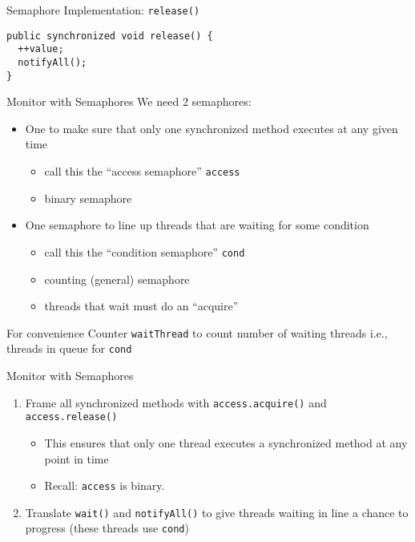 \begin{frame}[fragile]{Semaphore Implementation: \lstinline!release()!}
\begin{lstlisting}
public synchronized void release() {
  ++value;
  notifyAll();
}
\end{lstlisting}
\end{frame}

\begin{frame}{Monitor with Semaphores}
  We need 2 semaphores:
  \begin{itemize}
  \item	One to make sure that only one synchronized method executes at any given time
    \begin{itemize}
    \item call this the ``access semaphore'' \lstinline!access!
    \item binary semaphore
    \end{itemize}
  \item One semaphore to line up threads that are waiting for some condition
    \begin{itemize}
    \item call this the ``condition semaphore'' \lstinline!cond!
    \item counting (general) semaphore
    \item threads that wait must do an ``acquire''
    \end{itemize}
  \end{itemize}


  \begin{block}{For convenience}
    Counter \lstinline!waitThread! to count number of waiting threads
    i.e., threads in queue for \lstinline!cond!
  \end{block}  
\end{frame}

\begin{frame}{Monitor with Semaphores}
  \begin{enumerate}
  \item Frame all synchronized methods with \lstinline!access.acquire()! and
    \lstinline!access.release()!
    \begin{itemize}
    \item This ensures that only one thread executes a synchronized
      method at any point in time
    \item Recall: \lstinline!access! is binary.
    \end{itemize}
  \item Translate \lstinline!wait()! and \lstinline!notifyAll()! to give threads waiting in
    line a chance to progress (these threads use \lstinline!cond!)
  \end{enumerate}  
\end{frame}

